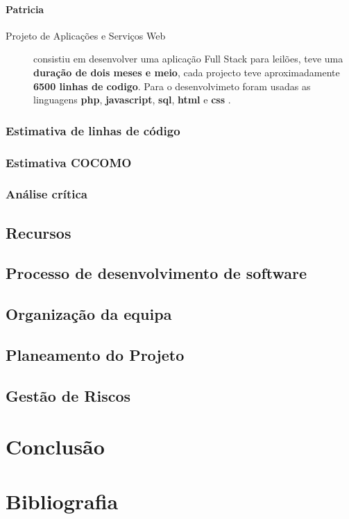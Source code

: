 \documentclass[a4paper]{report}
\begin{document}
\subsubsection*{Patricia}
\begin{description}
    \item[Projeto de Aplicações e Serviços Web] consistiu em desenvolver uma aplicação Full Stack para leilões, teve uma \textbf{duração de dois meses e meio}, cada projecto teve aproximadamente \textbf{6500 linhas de codigo}. Para o desenvolvimeto foram usadas as linguagens \textbf{php}, \textbf{javascript}, \textbf{sql}, \textbf{html} e \textbf{css} .
\end{description}

\subsection{Estimativa de linhas de código}
\subsection{Estimativa COCOMO}
\subsection{Análise crítica}
\section{Recursos}
\section{Processo de desenvolvimento de software}
\section{Organização da equipa}
\section{Planeamento do Projeto}
\section{Gestão de Riscos}
\chapter{Conclusão}
\chapter{Bibliografia }
\end{document}
